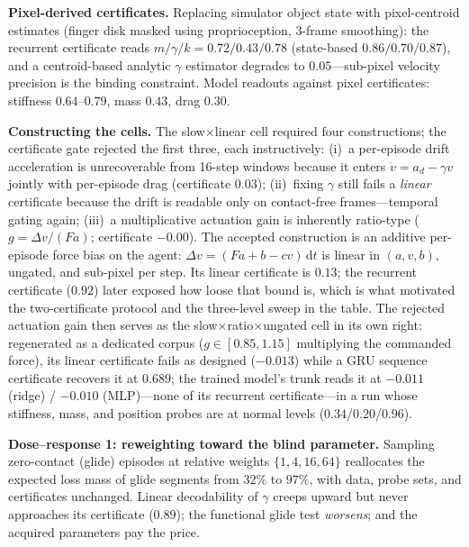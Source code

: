\documentclass{article} %
\begin{document}
\textbf{Pixel-derived certificates.} Replacing simulator object state with
pixel-centroid estimates (finger disk masked using proprioception, 3-frame
smoothing): the recurrent certificate reads $m/\gamma/k = 0.72/0.43/0.78$
(state-based $0.86/0.70/0.87$), and a centroid-based analytic $\gamma$
estimator degrades to $0.05$---sub-pixel velocity precision is the binding
constraint. Model readouts against pixel certificates: stiffness
$0.64$--$0.79$, mass $0.43$, drag $0.30$.

\textbf{Constructing the cells.} The slow$\times$linear cell required
four constructions; the certificate gate rejected the first three, each
instructively: (i)~a per-episode drift acceleration is unrecoverable from
16-step windows because it enters $\dot v = a_d - \gamma v$ jointly with
per-episode drag (certificate $0.03$); (ii)~fixing $\gamma$ still fails a
\emph{linear} certificate because the drift is readable only on contact-free
frames---temporal gating again; (iii)~a multiplicative actuation gain is
inherently ratio-type ($g = \Delta v / (F a)$; certificate $-0.00$). The
accepted construction is an additive per-episode force bias on the agent:
$\Delta v = (Fa + b - cv)\,\mathrm{d}t$ is linear in $(a, v, b)$, ungated, and
sub-pixel per step. Its linear certificate is $0.13$; the recurrent
certificate ($0.92$) later exposed how loose that bound is, which is what
motivated the two-certificate protocol and the three-level sweep in the
table. The rejected actuation gain then
serves as the slow$\times$ratio$\times$ungated cell in its own right:
regenerated as a dedicated corpus ($g \in [0.85, 1.15]$ multiplying the
commanded force), its linear certificate fails as designed ($-0.013$) while a
GRU sequence certificate recovers it at $0.689$; the trained model's trunk
reads it at $-0.011$ (ridge) / $-0.010$ (MLP)---none of its recurrent
certificate---in
a run whose stiffness, mass, and position probes are at normal levels
($0.34$/$0.20$/$0.96$).

\textbf{Dose--response 1: reweighting toward the blind parameter.} Sampling
zero-contact (glide) episodes at relative weights $\{1,4,16,64\}$
reallocates the expected loss mass of glide segments from $32\%$ to $97\%$,
with data, probe sets, and certificates unchanged. Linear decodability of
$\gamma$ creeps upward but never approaches its certificate ($0.89$); the
functional glide test \emph{worsens}; and the acquired parameters pay the
price.
\end{document}
